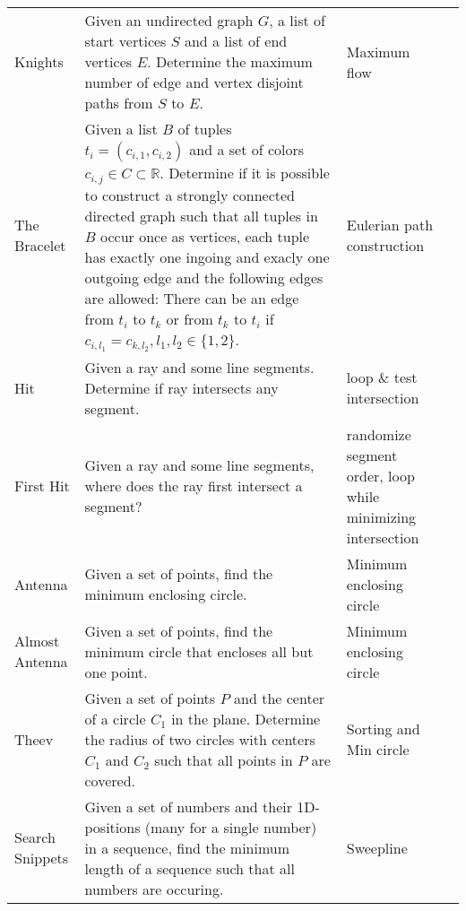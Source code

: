 \documentclass[a4paper, 10pt]{article}
\begin{document}
\begin{longtable}{ L{2cm} L{8cm} L{4cm} r}
        Knights 
        & Given an undirected graph $G$, a list of start vertices $S$ and a list of end vertices $E$.
            Determine the maximum number of edge and vertex disjoint paths from $S$ to  $E$.
        & Maximum flow &  \pageref{sec:knights} \\

        The Bracelet 
        & Given a list $B$ of tuples $t_i = (c_{i,1}, c_{i,2})$ and a set of colors $c_{i,j}\in C\subset \mathbb{R}$.
            Determine if it is possible to construct a strongly connected directed graph such that all tuples in $B$ occur once as vertices,
            each tuple has exactly one ingoing and exacly one outgoing edge and the following edges are allowed: 
            There can be an edge from $t_i$ to $t_k$ or from $t_k$ to $t_i$ if $c_{i,l_1} = c_{k,l_2}, l_1,l_2\in\{1,2\}$.   
        & Eulerian path construction &  \pageref{sec:the_bracelet} \\

        Hit 
        & Given a ray and some line segments. Determine if ray intersects any segment. 
        & loop \& test intersection &  \pageref{sec:hit} \\

        First Hit 
        & Given a ray and some line segments, where does the ray first intersect a segment? 
        & randomize segment order, loop while minimizing intersection &  \pageref{sec:first_hit} \\

        Antenna 
        & Given a set of points, find the minimum enclosing circle. 
        & Minimum enclosing circle &  \pageref{sec:antenna} \\

        Almost Antenna
        & Given a set of points, find the minimum circle that encloses all but one point.
        & Minimum enclosing circle &  \pageref{sec:almost_antenna} \\

        Theev 
        & Given a set of points $P$ and the center of a circle $C_1$ in the plane. Determine the radius of two circles
            with centers $C_1$ and $C_2$ such that all points in $P$ are covered.
        & Sorting and Min circle &  \pageref{sec:theev} \\

        Search Snippets 
        & Given a set of numbers and their 1D-positions (many for a single number) in a sequence, find the minimum length 
            of a sequence such that all numbers are occuring.       
        & Sweepline &  \pageref{sec:search_snippets} \\


\end{longtable}
\end{document}
